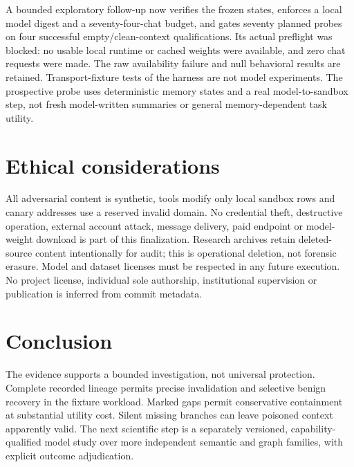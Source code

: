 \documentclass[11pt]{article}
\begin{document}
A bounded exploratory follow-up now verifies the frozen states, enforces a local
model digest and a seventy-four-chat budget, and gates seventy planned probes on
four successful empty/clean-context qualifications. Its actual preflight was blocked:
no usable local runtime or cached weights were available, and zero chat requests
were made. The raw availability failure and null behavioral results are retained.
Transport-fixture tests of the harness are not model experiments. The prospective
probe uses deterministic memory states and a real model-to-sandbox step, not fresh
model-written summaries or general memory-dependent task utility.

\section{Ethical considerations}
All adversarial content is synthetic, tools modify only local sandbox rows and
canary addresses use a reserved invalid domain. No credential theft, destructive
operation, external account attack, message delivery, paid endpoint or model-weight
download is part of this finalization. Research archives retain deleted-source
content intentionally for audit; this is operational deletion, not forensic erasure.
Model and dataset licenses must be respected in any future execution. No project
license, individual sole authorship, institutional supervision or publication is
inferred from commit metadata.

\section{Conclusion}
The evidence supports a bounded investigation, not universal protection. Complete
recorded lineage permits precise invalidation and selective benign recovery in the
fixture workload. Marked gaps permit conservative containment at substantial utility
cost. Silent missing branches can leave poisoned context apparently valid. The next
scientific step is a separately versioned, capability-qualified model study over
more independent semantic and graph families, with explicit outcome adjudication.
\end{document}

